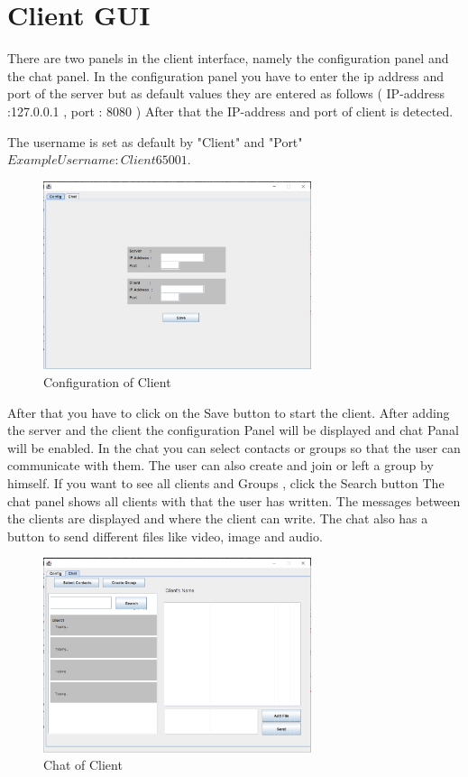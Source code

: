 \section {Client GUI}\label{sec:client-gui}
There are two panels in the client interface, namely the configuration panel and the chat panel.
In the configuration panel you have to enter the ip address and port of the server but as default
values they are entered as follows ( IP-address :127.0.0.1 , port : 8080 ) After that the
IP-address and port of client is detected.
\medskip

\noindent
The username is set as default by "Client" and "Port" \( Example Username : Client65001\).
\begin{figure}
    \centering
    \includegraphics[width=0.7\textwidth]{gfx/Client_Config}
    \caption{Configuration of Client}
    \label{fig:Client-config}
\end{figure}
\noindent
After that you have to click on the Save button to start the client.
After adding the server and the client the configuration Panel will be displayed and chat Panal
will be enabled.
In the chat you can select contacts or groups so that the user can communicate with them.
The user can also create and join or left a group by himself.
If you want to see all clients and Groups , click the Search button
The chat panel shows all clients with that the user has written.
The messages between the clients are displayed and where the client can write.
The chat also has a button to send different files like video, image and audio.
\begin{figure}
    \centering
    \includegraphics[width=0.7\textwidth]{gfx/Client_Chat}
    \caption{Chat of Client}
    \label{fig:Client-Chat}
\end{figure}

